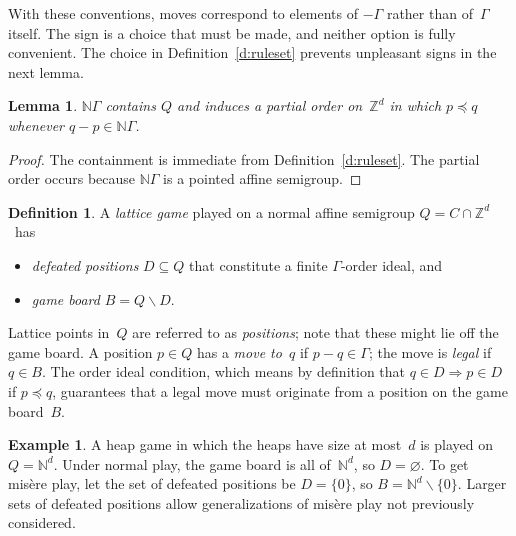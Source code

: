 \documentclass[12pt]{amsart}
\numberwithin{equation}{section}
\newtheorem{lemma}[thm]{Lemma}
\theoremstyle{definition}
\newtheorem{defn}[thm]{Definition}
\newtheorem{example}[thm]{Example}
\begin{document}
With these conventions, moves correspond to elements of $-\Gamma$
rather than of~$\Gamma$ itself.  The sign is a choice that must be
made, and neither option is fully convenient.  The choice in
Definition~\ref{d:ruleset} prevents unpleasant signs in the next
lemma.

\begin{lemma}\label{l:NG}
${\mathbb{N}}\Gamma$ contains $Q$ and induces a partial order on~${\mathbb{Z}}^d$ in
which $p \preceq q$ whenever $q - p \in {\mathbb{N}}\Gamma$.
\end{lemma}
\begin{proof}
The containment is immediate from Definition~\ref{d:ruleset}.  The
partial order occurs because ${\mathbb{N}}\Gamma$ is a pointed affine
semigroup.
\end{proof}

\begin{defn}\label{d:latticegame}
A \emph{lattice game} played on a normal affine semigroup $Q = C \cap
{\mathbb{Z}}^d$~has
\begin{itemize}
\itema rule set $\Gamma$,

\item\emph{defeated positions} $D \subseteq Q$ that constitute a finite
$\Gamma$-order ideal, and

\item\emph{game board} $B = Q {\smallsetminus} D$.
\end{itemize}
\end{defn}

Lattice points in~$Q$ are referred to as \emph{positions}; note that
these might lie off the game board.  A position $p \in Q$ has a
\emph{move to~$q$} if $p - q \in \Gamma$; the move is \emph{legal} if
$q \in B$.  The order ideal condition, which means by definition that
$q \in D {\Rightarrow} p \in D$ if $p \preceq q$, guarantees that a legal
move must originate from a position on the game board~$B$.

\begin{example}
A heap game in which the heaps have size at most~$d$ is played on $Q =
{\mathbb{N}}^d$.  Under normal play, the game board is all of~${\mathbb{N}}^d$, so $D =
{\varnothing}$.  To get mis\`ere play, let the set of defeated positions be
$D = \{0\}$, so $B = {\mathbb{N}}^d {\smallsetminus} \{0\}$.  Larger sets of defeated
positions allow generalizations of mis\`ere play not previously
considered.
\end{example}
\end{document}
